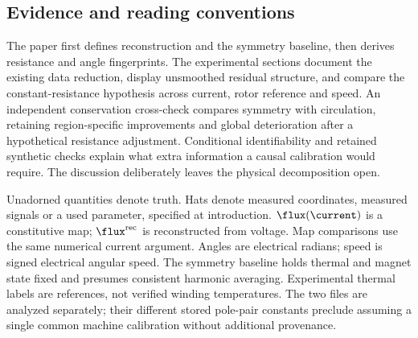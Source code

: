 \subsection{Evidence and reading conventions}
The paper first defines reconstruction and the symmetry baseline, then derives
resistance and angle fingerprints. The experimental sections document the
existing data reduction, display unsmoothed residual structure, and compare
the constant-resistance hypothesis across current, rotor reference and speed.
An independent conservation cross-check compares symmetry with circulation,
retaining region-specific improvements and global deterioration after a
hypothetical resistance adjustment. Conditional identifiability and retained
synthetic checks explain what extra
information a causal calibration would require. The discussion deliberately
leaves the physical decomposition open.

Unadorned quantities denote truth. Hats denote measured coordinates, measured
signals or a used parameter, specified at introduction.
$\flux(\current)$ is a constitutive map; $\flux^{\rm rec}$ is reconstructed
from voltage. Map comparisons use the same numerical current argument.
Angles are electrical radians; speed is signed electrical angular speed.
The symmetry baseline holds thermal and magnet state fixed and presumes
consistent harmonic averaging. Experimental thermal labels are references,
not verified winding temperatures. The two files are analyzed separately;
their different stored pole-pair constants preclude assuming a single common
machine calibration without additional provenance.
